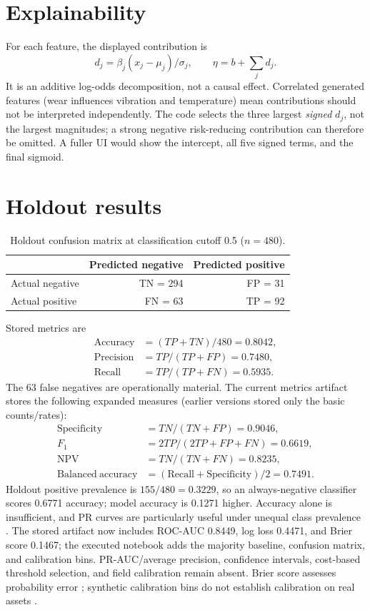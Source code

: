 \section{Explainability}
For each feature, the displayed contribution is
\begin{equation}d_j=\beta_j(x_j-\mu_j)/\sigma_j,\qquad \eta=b+\sum_jd_j.\end{equation}
It is an additive log-odds decomposition, not a causal effect. Correlated generated features (wear influences vibration and temperature) mean contributions should not be interpreted independently. The code selects the three largest \emph{signed} $d_j$, not the largest magnitudes; a strong negative risk-reducing contribution can therefore be omitted. A fuller UI would show the intercept, all five signed terms, and the final sigmoid.

\section{Holdout results}
\begin{table}[H]
\centering
\caption{Holdout confusion matrix at classification cutoff 0.5 ($n=480$).}
\begin{tabular}{lrr}
\toprule & Predicted negative & Predicted positive\\
\midrule
Actual negative & TN = 294 & FP = 31\\
Actual positive & FN = 63 & TP = 92\\
\bottomrule
\end{tabular}
\end{table}
Stored metrics are
\begin{align}
\mathrm{Accuracy}&=(TP+TN)/480=0.8042,\\
\mathrm{Precision}&=TP/(TP+FP)=0.7480,\\
\mathrm{Recall}&=TP/(TP+FN)=0.5935.
\end{align}
The 63 false negatives are operationally material. The current metrics artifact stores the following expanded measures (earlier versions stored only the basic counts/rates):
\begin{align}
\mathrm{Specificity}&=TN/(TN+FP)=0.9046,\\
F_1&=2TP/(2TP+FP+FN)=0.6619,\\
\mathrm{NPV}&=TN/(TN+FN)=0.8235,\\
\mathrm{Balanced\ accuracy}&=(\mathrm{Recall}+\mathrm{Specificity})/2=0.7491.
\end{align}
Holdout positive prevalence is $155/480=0.3229$, so an always-negative classifier scores 0.6771 accuracy; model accuracy is 0.1271 higher. Accuracy alone is insufficient, and PR curves are particularly useful under unequal class prevalence \citep{saito2015pr}. The stored artifact now includes ROC-AUC 0.8449, log loss 0.4471, and Brier score 0.1467; the executed notebook adds the majority baseline, confusion matrix, and calibration bins. PR-AUC/average precision, confidence intervals, cost-based threshold selection, and field calibration remain absent. Brier score assesses probability error \citep{brier1950}; synthetic calibration bins do not establish calibration on real assets \citep{guo2017calibration}.

